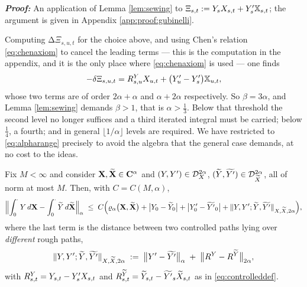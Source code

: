 \textbf{\textit{Proof:}} An application of Lemma \ref{lem:sewing} to
$\Xi_{s,t} := Y_sX_{s,t} + Y'_s\mathbb{X}_{s,t}$; the argument is given in Appendix
\ref{app:proof:gubinelli}. \qedfilledtext

\begin{remark}\label{rem:whyonethird}
 Computing
$\increment{\Xi}_{s,u,t}$ for the choice above, and using Chen's relation \eqref{eq:chenaxiom} to
cancel the leading terms --- this is the computation in the appendix, and it is the only place
where \eqref{eq:chenaxiom} is used --- one finds
\begin{equation}\label{eq:xidefect}
-\delta \Xi_{s,u,t} = R^{Y}_{s,u}X_{u,t} + \bigl(Y'_u - Y'_s\bigr)\mathbb{X}_{u,t},
\end{equation}
whose two terms are of order $2\alpha + \alpha$ and $\alpha + 2\alpha$ respectively. So
$\beta = 3\alpha$, and Lemma \ref{lem:sewing} demands $\beta > 1$, that is $\alpha > \tfrac13$.
Below that threshold the second level no longer suffices and a third iterated integral must be
carried; below $\tfrac14$, a fourth; and in general $\lfloor 1/\alpha\rfloor$ levels are required.
We have restricted to \eqref{eq:alpharange} precisely to avoid the algebra that the general case
demands, at no cost to the ideas.
\end{remark}

\begin{theorem}\label{thm:integralstability}
Fix $M<\infty$ and consider $\mathbf{X},\widetilde{\mathbf{X}} \in \mathbf{C}^{\alpha}$ and $(Y,Y')\in\mathcal{D}^{2\alpha}_{X}$,
$(\widetilde Y,\widetilde{Y'})\in\mathcal{D}^{2\alpha}_{\widetilde X}$, all of norm at most $M$. Then, with
$C = C(M,\alpha)$,
\begin{equation}\label{eq:integralstability}
\Bigl\lVert \int_0^{\cdot} Y\,d\mathbf{X} - \int_0^{\cdot} \widetilde Y\,d\widetilde{\mathbf{X}} \Bigr\rVert_{\alpha}
\;\leq\; C\Bigl( \varrho_{\alpha}\bigl(\mathbf{X},\widetilde{\mathbf{X}}\bigr) + \bigl|Y_0 - \widetilde Y_0\bigr| + \bigl|Y'_0 - \widetilde{Y'}_0\bigr| + \lVert Y,Y';\widetilde Y,\widetilde {Y'}\rVert_{X,\widetilde X,2\alpha} \Bigr),
\end{equation}
where the last term is the distance between two controlled paths lying over \emph{different}
rough paths,
\begin{equation}\label{eq:controlleddistance}
\lVert Y,Y';\widetilde Y,\widetilde{Y'}\rVert_{X,\widetilde X,2\alpha}
\;:=\; \bigl\lVert Y' - \widetilde{Y'} \bigr\rVert_{\alpha} \;+\; \bigl\lVert R^{Y} - R^{\widetilde Y}\bigr\rVert_{2\alpha},
\end{equation}
with $R^Y_{s,t} = Y_{s,t} - Y'_sX_{s,t}$ and
$R^{\widetilde Y}_{s,t} = \widetilde Y_{s,t} - \widetilde{Y'}_s\widetilde X_{s,t}$ as in
\eqref{eq:controlleddef}. \qedopentext
\end{theorem}


